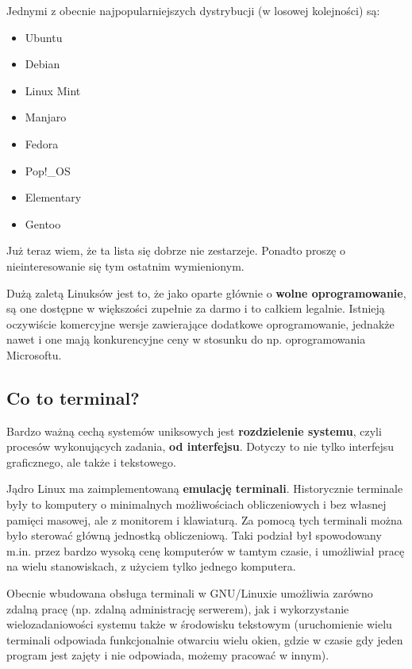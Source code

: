 \documentclass[11pt, a4paper]{article}
\begin{document}
Jednymi z obecnie najpopularniejszych dystrybucji (w losowej kolejności) są:

\begin{itemize}
    \item Ubuntu
    \item Debian
    \item Linux Mint
    \item Manjaro
    \item Fedora
    \item Pop!\_OS
    \item Elementary
    \item Gentoo
\end{itemize}

Już teraz wiem, że ta lista się dobrze nie zestarzeje. Ponadto proszę o nieinteresowanie się tym ostatnim wymienionym.

Dużą zaletą Linuksów jest to, że jako oparte głównie o \textbf{wolne oprogramowanie}, są one dostępne w większości zupełnie za darmo i to całkiem legalnie. Istnieją oczywiście komercyjne wersje zawierające dodatkowe oprogramowanie, jednakże nawet i one mają konkurencyjne ceny w stosunku do np. oprogramowania Microsoftu. 

\subsection{Co to terminal?}

Bardzo ważną cechą systemów uniksowych jest \textbf{rozdzielenie systemu}, czyli procesów wykonujących zadania, \textbf{od interfejsu}. Dotyczy to nie tylko interfejsu graficznego, ale także i tekstowego.

Jądro Linux ma zaimplementowaną \textbf{emulację terminali}. Historycznie terminale były to komputery o minimalnych możliwościach obliczeniowych i bez własnej pamięci masowej, ale z monitorem i klawiaturą. Za pomocą tych terminali można było sterować główną jednostką obliczeniową. Taki podział był spowodowany m.in. przez bardzo wysoką cenę komputerów w tamtym czasie, i umożliwiał pracę na wielu stanowiskach, z użyciem tylko jednego komputera.

Obecnie wbudowana obsługa terminali w GNU/Linuxie umożliwia zarówno zdalną pracę (np. zdalną administrację serwerem), jak i wykorzystanie wielozadaniowości systemu także w środowisku tekstowym (uruchomienie wielu terminali odpowiada funkcjonalnie otwarciu wielu okien, gdzie w czasie gdy jeden program jest zajęty i nie odpowiada, możemy pracować w innym).
\end{document}
